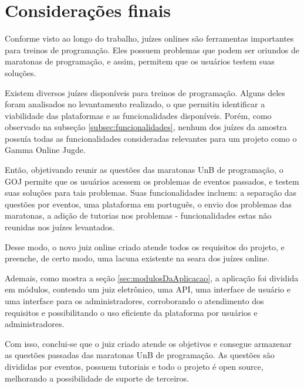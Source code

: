 \chapter[Considerações finais]{Considerações finais}
\label{chap:conclusao}

Conforme visto ao longo do trabalho, juízes onlines são ferramentas importantes para treinos de programação. Eles possuem problemas que podem ser oriundos de maratonas de programação, e assim, permitem que os usuários testem suas soluções.

Existem diversos juízes disponíveis para treinos de programação. Alguns deles foram analisados no levantamento realizado, o que permitiu identificar a viabilidade das plataformas e as funcionalidades disponíveis. Porém, como observado na subseção \ref{subsec:funcionalidades}, nenhum dos juízes da amostra possuía todas as funcionalidades consideradas relevantes para um projeto como o Gamma Online Jugde.

Então, objetivando reunir as questões das maratonas UnB de programação, o GOJ permite que os usuários acessem os problemas de eventos passados, e testem suas soluções para tais problemas. Suas funcionalidades incluem: a separação das questões por eventos, uma plataforma em português, o envio dos problemas das maratonas, a adição de tutorias nos problemas - funcionalidades estas não reunidas nos juízes levantados. 

Desse modo, o novo juiz online criado atende todos os requisitos do projeto, e preenche, de certo modo, uma lacuna existente na seara dos juízes online. 

Ademais, como mostra a seção \ref{sec:modulosDaAplicacao}, a aplicação foi dividida em módulos, contendo um juiz eletrônico, uma API, uma interface de usuário e uma interface para os administradores, corroborando o atendimento dos requisitos e possibilitando o uso eficiente da plataforma por usuários e administradores.

Com isso, conclui-se que o juiz criado atende os objetivos e consegue armazenar as questões passadas das maratonas UnB de programação. As questões são divididas por eventos, possuem tutoriais e todo o projeto é open source, melhorando a possibilidade de suporte de terceiros.